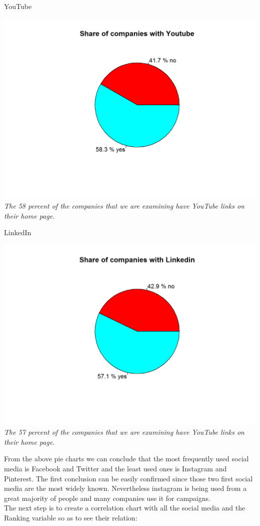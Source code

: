 \documentclass{article}
\begin{document}
\begin{table}[H]
\centering
\caption{YouTube}
\begin{center}
\includegraphics[scale=0.5]{../R/photos/18_yt_dist.png}  \\
\textit{The 58 percent of the companies that we are examining have YouTube links on their home page.}
\end{center}
\end{table}

\begin{table}[H]
\centering
\caption{LinkedIn}
\begin{center}
\includegraphics[scale=0.5]{../R/photos/20_linkedin_dist.png}  \\
\textit{The 57 percent of the companies that we are examining have YouTube links on their home page.}
\end{center}
\end{table}
From the above pie charts we can conclude that the most frequently used social media is Facebook and Twitter and the least used ones is Instagram and Pinterest. The first conclusion can be easily confirmed since those two first social media are the most widely known. Nevertheless instagram is being used from a great majority of people and many companies use it for campaigns.\\
The next step is to create a correlation chart with all the social media and the Ranking variable so as to see their relation:
\end{document}
